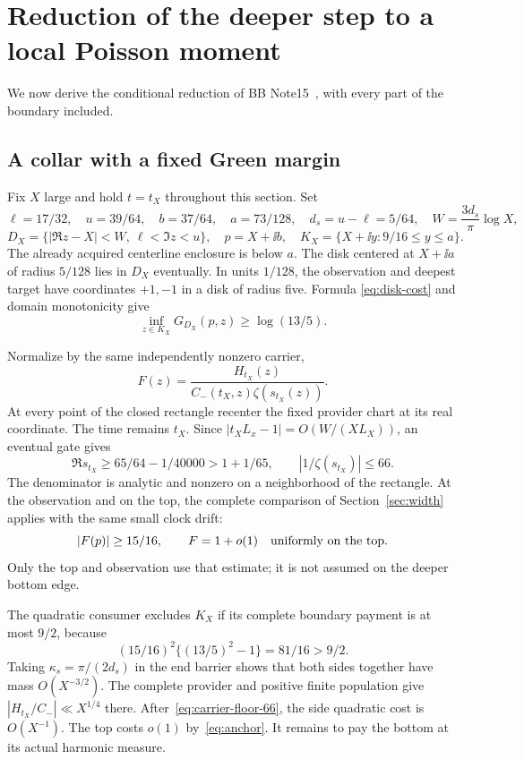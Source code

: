 \section{Reduction of the deeper step to a local Poisson moment}\label{sec:moment}

We now derive the conditional reduction of BB Note15~\cite{BB15},
with every part of the boundary included.

\subsection{A collar with a fixed Green margin}

Fix $X$ large and hold $t=t_X$ throughout this section. Set
\[
 \ell=17/32,\quad u=39/64,\quad b=37/64,\quad a=73/128,
 \quad d_s=u-\ell=5/64,\quad W=\frac{3d_s}{\pi}\log X,
\]
\[
 D_X=\{|\Re z-X|<W,\ \ell<\Im z<u\},\quad
 p=X+\ii b,\quad K_X=\{X+\ii y:9/16\le y\le a\}.
\]
The already acquired centerline enclosure is below $a$.
The disk centered at $X+\ii a$ of radius $5/128$ lies in $D_X$
eventually. In units $1/128$, the observation and deepest target have
coordinates $+1,-1$ in a disk of radius five. Formula
\eqref{eq:disk-cost} and domain monotonicity give
\begin{equation}\label{eq:green-signal}
 \inf_{z\in K_X}G_{D_X}(p,z)\ge\log(13/5).
\end{equation}

Normalize by the same independently nonzero carrier,
\[
 F(z)=\frac{H_{t_X}(z)}{C_-(t_X,z)\zeta(s_{t_X}(z))}.
\]
At every point of the closed rectangle recenter the fixed provider
chart at its real coordinate. The time remains $t_X$.
Since $|t_XL_x-1|=O(W/(XL_X))$, an eventual gate gives
\begin{equation}\label{eq:carrier-floor-66}
 \Re s_{t_X}\ge65/64-1/40000>1+1/65,
 \qquad |1/\zeta(s_{t_X})|\le66.
\end{equation}
The denominator is analytic and nonzero on a neighborhood of the
rectangle. At the observation and on the top, the complete comparison
of Section~\ref{sec:width} applies with the same small clock drift:
\begin{equation}\label{eq:anchor}
 |F(p)|\ge15/16,\qquad F=1+o(1)\quad\hbox{uniformly on the top}.
\end{equation}
Only the top and observation use that estimate; it is not assumed
on the deeper bottom edge.

The quadratic consumer excludes $K_X$ if its complete boundary
payment is at most $9/2$, because
\begin{equation}\label{eq:margin-81}
 (15/16)^2\{(13/5)^2-1\}=81/16>9/2.
\end{equation}
Taking $\kappa_s=\pi/(2d_s)$ in the end barrier shows that both
sides together have mass $O(X^{-3/2})$. The complete provider and
positive finite population give $|H_{t_X}/C_-|\ll X^{1/4}$ there.
After~\eqref{eq:carrier-floor-66}, the side quadratic cost is
$O(X^{-1})$. The top costs $o(1)$ by~\eqref{eq:anchor}.
It remains to pay the bottom at its actual harmonic measure.

